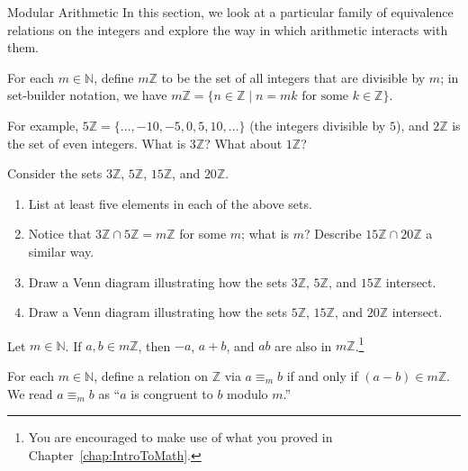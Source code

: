 \begin{section}{Modular Arithmetic}\label{sec:ModularArithmetic}
In this section, we look at a particular family of equivalence relations on the integers and explore the way in which arithmetic interacts with them.

\begin{definition}
For each $m\in \mathbb{N}$, define $m\mathbb{Z}$ to be the set of all integers that are divisible by $m$; in set-builder notation, we have   $m\mathbb{Z} = \{n \in \mathbb{Z}  \mid n = mk \text{ for some } k \in \mathbb{Z}\}.$

\end{definition}

For example, $5 \mathbb{Z} = \{ \ldots,-10,-5,0,5,10,\ldots\}$ (the integers divisible by $5$), and $2\mathbb{Z}$ is the set of even integers. What is $3\mathbb{Z}$? What about $1\mathbb{Z}$?

\begin{exercise} 
Consider the sets $3 \mathbb{Z}$, $5 \mathbb{Z}$, $15 \mathbb{Z}$, and $20 \mathbb{Z}$.
\begin{enumerate}[label=\textrm{(\alph*)}]
\item List at least five elements in each of the above sets.
\item Notice that $3 \mathbb{Z} \cap5 \mathbb{Z} = m\mathbb{Z}$ for some $m$; what is $m$? Describe $15 \mathbb{Z}\cap 20 \mathbb{Z}$ a similar way.
\item Draw a Venn diagram illustrating how the sets $3 \mathbb{Z}$, $5 \mathbb{Z}$, and $15 \mathbb{Z}$ intersect.  
\item Draw a Venn diagram illustrating how the sets $5 \mathbb{Z}$, $15 \mathbb{Z}$, and $20 \mathbb{Z}$ intersect.
\end{enumerate}
\end{exercise}

\begin{theorem}
Let $m\in \mathbb{N}$. If $a,b \in m \mathbb{Z}$, then $-a$, $a+b$, and $ab$ are also in $m \mathbb{Z}$.\footnote{You are encouraged to make use of what you proved in Chapter~\ref{chap:IntroToMath}.}
\end{theorem}

\begin{definition}\label{def:modulo}
For each  $m\in \mathbb{N}$,  define a relation on $\mathbb{Z}$ via $a\equiv_m b$ if and only if $(a-b) \in m\mathbb{Z}$. We read $a\equiv_m b$ as ``$a$ is congruent to $b$ modulo $m$.''
\end{definition}


\end{section}
